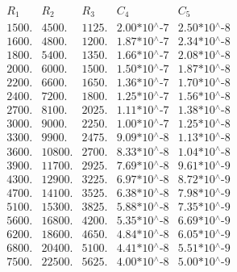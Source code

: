 \documentclass{llncs}
\begin{document}
	\begin{table}[!h]
		$$
		\begin{array}{|c|c|c|c|c|}
		\hline
		R_1    & R_2  & R_3   & C_4                          & C_5 \\
		\hline
		1500. & 4500. & 1125. & \text{2.00*10${}^{\wedge}$-7} & \text{2.50*10${}^{\wedge}$-8} \\
		1600. & 4800. & 1200. & \text{1.87*10${}^{\wedge}$-7} & \text{2.34*10${}^{\wedge}$-8} \\
		1800. & 5400. & 1350. & \text{1.66*10${}^{\wedge}$-7} & \text{2.08*10${}^{\wedge}$-8} \\
		2000. & 6000. & 1500. & \text{1.50*10${}^{\wedge}$-7} & \text{1.87*10${}^{\wedge}$-8} \\
		2200. & 6600. & 1650. & \text{1.36*10${}^{\wedge}$-7} & \text{1.70*10${}^{\wedge}$-8} \\
		2400. & 7200. & 1800.     & \text{1.25*10${}^{\wedge}$-7} & \text{1.56*10${}^{\wedge}$-8} \\
		2700. & 8100. & 2025.     & \text{1.11*10${}^{\wedge}$-7} & \text{1.38*10${}^{\wedge}$-8} \\
		3000. & 9000. & 2250.     & \text{1.00*10${}^{\wedge}$-7} & \text{1.25*10${}^{\wedge}$-8} \\
		3300. & 9900. & 2475.     & \text{9.09*10${}^{\wedge}$-8} & \text{1.13*10${}^{\wedge}$-8} \\
		3600. & 10800. & 2700.    & \text{8.33*10${}^{\wedge}$-8} & \text{1.04*10${}^{\wedge}$-8} \\
		3900. & 11700. & 2925.    & \text{7.69*10${}^{\wedge}$-8} & \text{9.61*10${}^{\wedge}$-9} \\
		4300. & 12900. & 3225.    & \text{6.97*10${}^{\wedge}$-8} & \text{8.72*10${}^{\wedge}$-9} \\
		4700. & 14100. & 3525.    & \text{6.38*10${}^{\wedge}$-8} & \text{7.98*10${}^{\wedge}$-9} \\
		5100. & 15300. & 3825.    & \text{5.88*10${}^{\wedge}$-8} & \text{7.35*10${}^{\wedge}$-9} \\
		5600. & 16800. & 4200.    & \text{5.35*10${}^{\wedge}$-8} & \text{6.69*10${}^{\wedge}$-9} \\
		6200. & 18600. & 4650.    & \text{4.84*10${}^{\wedge}$-8} & \text{6.05*10${}^{\wedge}$-9} \\
		6800. & 20400. & 5100.    & \text{4.41*10${}^{\wedge}$-8} & \text{5.51*10${}^{\wedge}$-9} \\
		7500. & 22500. & 5625.    & \text{4.00*10${}^{\wedge}$-8} & \text{5.00*10${}^{\wedge}$-9} \\

\end{array}$$
\end{table}
\end{document}
